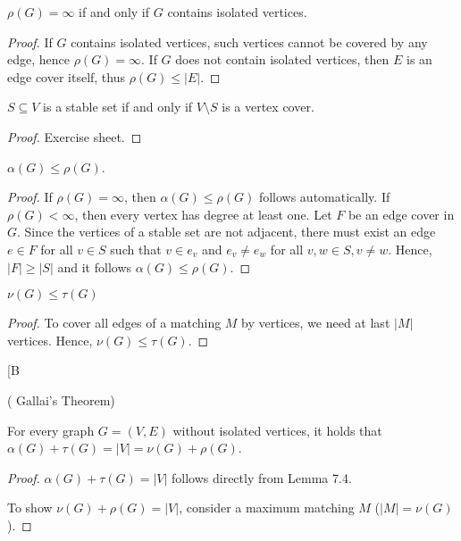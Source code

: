 \begin{lem}
$\rho(G) = \infty$ if and only if $G$ contains isolated vertices.
\end{lem}
\begin{proof}
If $G$ contains isolated vertices, such vertices cannot be covered by any
edge, hence $\rho(G) = \infty$. If $G$ does not contain isolated vertices,
then $E$ is an edge cover itself, thus $\rho(G) \leq |E|$.
\end{proof}

\begin{lem} %
$S \subseteq V$ is a stable set if and only if $V \setminus S$ is a vertex
cover.
\end{lem}
\begin{proof}
Exercise sheet.
\end{proof}

\begin{lem} %
$\alpha(G) \leq \rho(G)$.
\end{lem}
\begin{proof}
If $\rho(G) = \infty$, then $\alpha(G) \leq \rho(G)$ follows automatically.
If $\rho(G) < \infty$, then every vertex has degree at least one. Let $F$ be
an edge cover in $G$. Since the vertices of a stable set are not adjacent,
there must exist an edge $e \in F$ for all $v \in S$ such that $v \in e_v$
and $e_v \neq e_w$ for all $v, w \in S, v \neq w$. Hence, $|F| \geq |S|$ and
it follows $\alpha(G) \leq \rho(G)$.
\end{proof}

\begin{lem} %
$\nu(G) \leq \tau(G)$
\end{lem}
\begin{proof}
To cover all edges of a matching $M$ by vertices, we need at last $|M|$
vertices. Hence, $\nu(G) \leq \tau(G)$.
\end{proof}
[B
\begin{thm} %
( Gallai's Theorem)

For every graph $G = (V, E)$ without isolated vertices, it holds that
$\alpha(G) + \tau(G) = |V| = \nu(G) + \rho(G)$.
\end{thm}
\begin{proof}
$\alpha(G) + \tau(G) = |V|$ follows directly from Lemma 7.4.

To show $\nu(G) + \rho(G) = |V|$, consider a maximum matching $M$ ($|M| =
\nu(G)$).
\end{proof}

